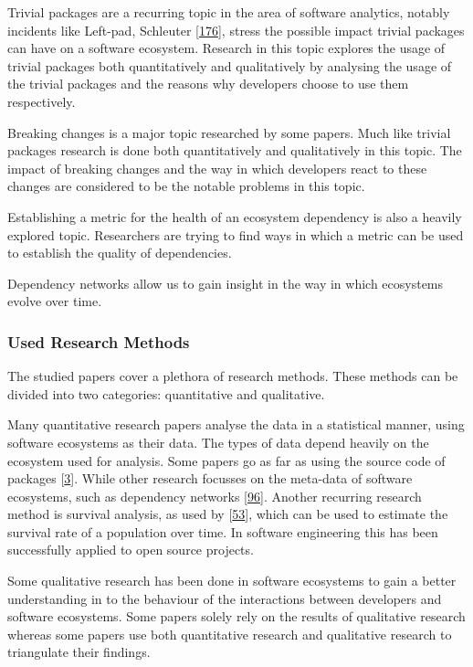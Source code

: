 \documentclass[]{book}
\begin{document}
Trivial packages are a recurring topic in the area of software
analytics, notably incidents like Left-pad, Schleuter
{[}\protect\hyperlink{ref-NPM2016}{176}{]}, stress the possible impact
trivial packages can have on a software ecosystem. Research in this
topic explores the usage of trivial packages both quantitatively and
qualitatively by analysing the usage of the trivial packages and the
reasons why developers choose to use them respectively.

Breaking changes is a major topic researched by some papers. Much like
trivial packages research is done both quantitatively and qualitatively
in this topic. The impact of breaking changes and the way in which
developers react to these changes are considered to be the notable
problems in this topic.

Establishing a metric for the health of an ecosystem dependency is also
a heavily explored topic. Researchers are trying to find ways in which a
metric can be used to establish the quality of dependencies.

Dependency networks allow us to gain insight in the way in which
ecosystems evolve over time.

\subsubsection{Used Research Methods}\label{used-research-methods}

The studied papers cover a plethora of research methods. These methods
can be divided into two categories: quantitative and qualitative.

Many quantitative research papers analyse the data in a statistical
manner, using software ecosystems as their data. The types of data
depend heavily on the ecosystem used for analysis. Some papers go as far
as using the source code of packages
{[}\protect\hyperlink{ref-Abdalkareem2017}{3}{]}. While other research
focusses on the meta-data of software ecosystems, such as dependency
networks {[}\protect\hyperlink{ref-Kikas2017}{96}{]}. Another recurring
research method is survival analysis, as used by
{[}\protect\hyperlink{ref-Decan2018}{53}{]}, which can be used to
estimate the survival rate of a population over time. In software
engineering this has been successfully applied to open source projects.

Some qualitative research has been done in software ecosystems to gain a
better understanding in to the behaviour of the interactions between
developers and software ecosystems. Some papers solely rely on the
results of qualitative research whereas some papers use both
quantitative research and qualitative research to triangulate their
findings.
\end{document}
